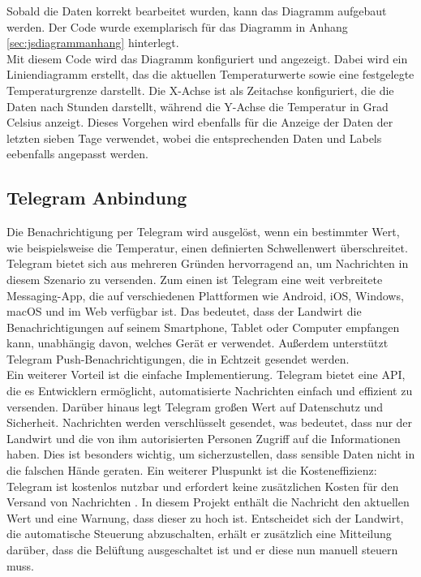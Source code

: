 \documentclass[conference]{IEEEtran}
\begin{document}
Sobald die Daten korrekt bearbeitet wurden, kann das Diagramm aufgebaut werden. Der Code wurde exemplarisch für das Diagramm in Anhang \ref{sec:jsdiagrammanhang} hinterlegt. \\
Mit diesem Code wird das Diagramm konfiguriert und angezeigt. Dabei wird ein Liniendiagramm erstellt, das die aktuellen Temperaturwerte sowie eine festgelegte Temperaturgrenze darstellt. Die X-Achse ist als Zeitachse konfiguriert, die die Daten nach Stunden darstellt, während die Y-Achse die Temperatur in Grad Celsius anzeigt. Dieses Vorgehen wird ebenfalls für die Anzeige der Daten der letzten sieben Tage verwendet, wobei die entsprechenden Daten und Labels eebenfalls angepasst werden.

\subsection{Telegram Anbindung}
Die Benachrichtigung per Telegram wird ausgelöst, wenn ein bestimmter Wert, wie beispielsweise die Temperatur, einen definierten Schwellenwert überschreitet. Telegram bietet sich aus mehreren Gründen hervorragend an, um Nachrichten in diesem Szenario zu versenden. Zum einen ist Telegram eine weit verbreitete Messaging-App, die auf verschiedenen Plattformen wie Android, iOS, Windows, macOS und im Web verfügbar ist. Das bedeutet, dass der Landwirt die Benachrichtigungen auf seinem Smartphone, Tablet oder Computer empfangen kann, unabhängig davon, welches Gerät er verwendet. Außerdem unterstützt Telegram Push-Benachrichtigungen, die in Echtzeit gesendet werden. \\
Ein weiterer Vorteil ist die einfache Implementierung. Telegram bietet eine API,  die es Entwicklern ermöglicht, automatisierte Nachrichten einfach und effizient zu versenden. Darüber hinaus legt Telegram großen Wert auf Datenschutz und Sicherheit. Nachrichten werden verschlüsselt gesendet, was bedeutet, dass nur der Landwirt und die von ihm autorisierten Personen Zugriff auf die Informationen haben. Dies ist besonders wichtig, um sicherzustellen, dass sensible Daten nicht in die falschen Hände geraten. Ein weiterer Pluspunkt ist die Kosteneffizienz: Telegram ist kostenlos nutzbar und erfordert keine zusätzlichen Kosten für den Versand von Nachrichten \cite{telegram}.
In diesem Projekt enthält die Nachricht den aktuellen Wert und eine Warnung, dass dieser zu hoch ist. Entscheidet sich der Landwirt, die automatische Steuerung abzuschalten, erhält er zusätzlich eine Mitteilung darüber, dass die Belüftung ausgeschaltet ist und er diese nun manuell steuern muss.
\end{document}
